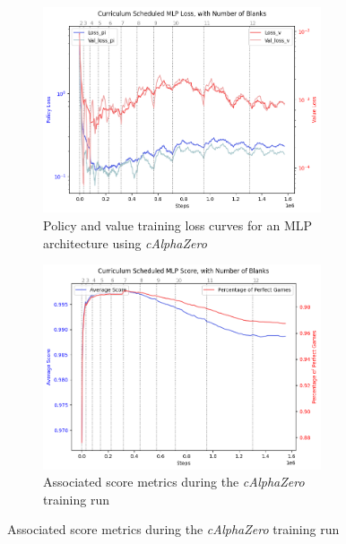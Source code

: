 \documentclass[10pt, reqno, letterpaper, twoside]{amsart}
\begin{document}
\begin{figure}[ht]
    \centering
    \begin{subfigure}[b]{0.45\textwidth}
        \centering
        \includegraphics[width=0.9\textwidth]{images/Curriculum Scheduled MLP Loss.png}
        \caption{Policy and value training loss curves for an MLP architecture using \textit{cAlphaZero}}
        \label{fig:MLP-loss-cAlphaZero}
    \end{subfigure}
    \hfill
    \begin{subfigure}[b]{0.45\textwidth}
        \centering
        \includegraphics[width=0.9\textwidth]{images/Curriculum Scheduled MLP Score.png}
        \caption{Associated score metrics during the \textit{cAlphaZero} training run}
        \label{fig:MLP-score-cAlphaZero}
    \end{subfigure}
    

\end{figure}
\end{document}
